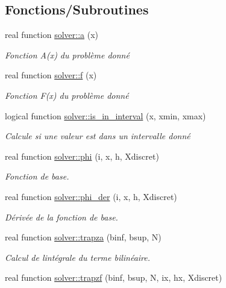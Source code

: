 \subsection*{Fonctions/\+Subroutines}
\begin{DoxyCompactItemize}
\item 
real function \hyperlink{namespacesolver_ab0081bb7880652eb26e65994f13fcb54}{solver\+::a} (x)
\begin{DoxyCompactList}\small\item\em Fonction A(x) du problème donné \end{DoxyCompactList}\item 
real function \hyperlink{namespacesolver_a6f4d43c88c7c8ebdea64bd45e002af05}{solver\+::f} (x)
\begin{DoxyCompactList}\small\item\em Fonction F(x) du problème donné \end{DoxyCompactList}\item 
logical function \hyperlink{namespacesolver_a2380e35eaa6fcef040f90bb5b23baa6a}{solver\+::is\+\_\+in\+\_\+interval} (x, xmin, xmax)
\begin{DoxyCompactList}\small\item\em Calcule si une valeur est dans un intervalle donné \end{DoxyCompactList}\item 
real function \hyperlink{namespacesolver_a3323b7ad7f72685a465733177c82e8cc}{solver\+::phi} (i, x, h, Xdiscret)
\begin{DoxyCompactList}\small\item\em Fonction de base. \end{DoxyCompactList}\item 
real function \hyperlink{namespacesolver_add1e5803b09e373fde46731960030e42}{solver\+::phi\+\_\+der} (i, x, h, Xdiscret)
\begin{DoxyCompactList}\small\item\em Dérivée de la fonction de base. \end{DoxyCompactList}\item 
real function \hyperlink{namespacesolver_a5cdc774a6979796cb6b072b2fbb0e5af}{solver\+::trapza} (binf, bsup, N)
\begin{DoxyCompactList}\small\item\em Calcul de l\textquotesingle{}intégrale du terme bilinéaire. \end{DoxyCompactList}\item 
real function \hyperlink{namespacesolver_adb6590794b23eaed708cd2e42adac550}{solver\+::trapzf} (binf, bsup, N, ix, hx, Xdiscret)

\end{DoxyCompactItemize}
